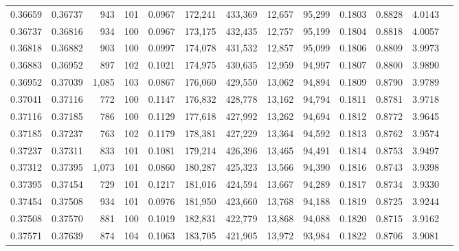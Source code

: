 \begin{tabular}{rrrrrrrrrrrrr}
0.36659 & 0.36737 &   943 & 101 &                                     0.0967 & 172,241 & 433,369 &  12,657 &  95,299 & 0.1803 & 0.8828 & 4.0143 \\
0.36737 & 0.36816 &   934 & 100 &                                     0.0967 & 173,175 & 432,435 &  12,757 &  95,199 & 0.1804 & 0.8818 & 4.0057 \\
0.36818 & 0.36882 &   903 & 100 &                                     0.0997 & 174,078 & 431,532 &  12,857 &  95,099 & 0.1806 & 0.8809 & 3.9973 \\
0.36883 & 0.36952 &   897 & 102 &                                     0.1021 & 174,975 & 430,635 &  12,959 &  94,997 & 0.1807 & 0.8800 & 3.9890 \\
0.36952 & 0.37039 & 1,085 & 103 &                                     0.0867 & 176,060 & 429,550 &  13,062 &  94,894 & 0.1809 & 0.8790 & 3.9789 \\
0.37041 & 0.37116 &   772 & 100 &                                     0.1147 & 176,832 & 428,778 &  13,162 &  94,794 & 0.1811 & 0.8781 & 3.9718 \\
0.37116 & 0.37185 &   786 & 100 &                                     0.1129 & 177,618 & 427,992 &  13,262 &  94,694 & 0.1812 & 0.8772 & 3.9645 \\
0.37185 & 0.37237 &   763 & 102 &                                     0.1179 & 178,381 & 427,229 &  13,364 &  94,592 & 0.1813 & 0.8762 & 3.9574 \\
0.37237 & 0.37311 &   833 & 101 &                                     0.1081 & 179,214 & 426,396 &  13,465 &  94,491 & 0.1814 & 0.8753 & 3.9497 \\
0.37312 & 0.37395 & 1,073 & 101 &                                     0.0860 & 180,287 & 425,323 &  13,566 &  94,390 & 0.1816 & 0.8743 & 3.9398 \\
0.37395 & 0.37454 &   729 & 101 &                                     0.1217 & 181,016 & 424,594 &  13,667 &  94,289 & 0.1817 & 0.8734 & 3.9330 \\
0.37454 & 0.37508 &   934 & 101 &                                     0.0976 & 181,950 & 423,660 &  13,768 &  94,188 & 0.1819 & 0.8725 & 3.9244 \\
0.37508 & 0.37570 &   881 & 100 &                                     0.1019 & 182,831 & 422,779 &  13,868 &  94,088 & 0.1820 & 0.8715 & 3.9162 \\
0.37571 & 0.37639 &   874 & 104 &                                     0.1063 & 183,705 & 421,905 &  13,972 &  93,984 & 0.1822 & 0.8706 & 3.9081 \\

\end{tabular}
